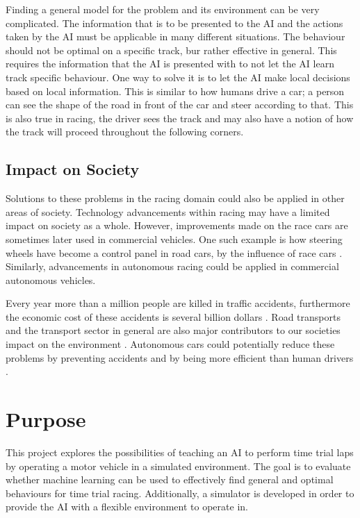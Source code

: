 Finding a general model for the problem and its environment can be very complicated. The information that is to be presented to the AI and the actions taken by the AI must be applicable in many different situations. The behaviour should not be optimal on a specific track, bur rather effective in general. This requires the information that the AI is presented with to not let the AI learn track specific behaviour. One way to solve it is to let the AI make local decisions based on local information. This is similar to how humans drive a car; a person can see the shape of the road in front of the car and steer according to that. This is also true in racing, the driver sees the track and may also have a notion of how the track will proceed throughout the following corners.

\subsection{Impact on Society}

Solutions to these problems in the racing domain could also be applied in other areas of society. Technology advancements within racing may have a limited impact on society as a whole. However, improvements made on the race cars are sometimes later used in commercial vehicles. One such example is how steering wheels have become a control panel in road cars, by the influence of race cars \cite{gkikas}. Similarly, advancements in autonomous racing could be applied in commercial autonomous vehicles. 

Every year more than a million people are killed in traffic accidents, furthermore the economic cost of these accidents is several billion dollars \cite{who:traffic}. Road transports and the transport sector in general are also major contributors to our societies impact on the environment \cite{fuglestvedt2008climate}. Autonomous cars could potentially reduce these problems by preventing accidents and by being more efficient than human drivers \cite{anderson}.


\section{Purpose}
\label{purpose}
This project explores the possibilities of teaching an AI to perform time trial laps by operating a motor vehicle in a simulated environment. The goal is to evaluate whether machine learning can be used to effectively find general and optimal behaviours for time trial racing. Additionally, a simulator is developed in order to provide the AI with a flexible environment to operate in.

